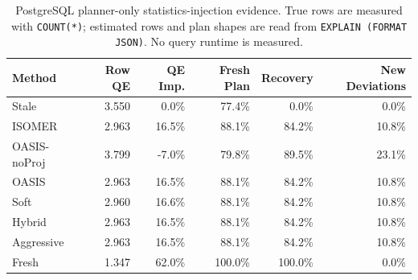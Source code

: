 \begin{table}[t]
  \centering
  \small
  \caption{PostgreSQL planner-only statistics-injection evidence. True rows are measured with \texttt{COUNT(*)}; estimated rows and plan shapes are read from \texttt{EXPLAIN (FORMAT JSON)}. No query runtime is measured.}
  \label{tab:postgres_planner_stats_injection}
  \setlength{\tabcolsep}{4pt}
  \begin{tabular}{lrrrrr}
    \toprule
    Method & Row QE & QE Imp. & Fresh Plan & Recovery & New Deviations \\
    \midrule
    Stale & 3.550 & 0.0\% & 77.4\% & 0.0\% & 0.0\% \\
    ISOMER & 2.963 & 16.5\% & 88.1\% & 84.2\% & 10.8\% \\
    OASIS-noProj & 3.799 & -7.0\% & 79.8\% & 89.5\% & 23.1\% \\
    OASIS & 2.963 & 16.5\% & 88.1\% & 84.2\% & 10.8\% \\
    Soft & 2.960 & 16.6\% & 88.1\% & 84.2\% & 10.8\% \\
    Hybrid & 2.963 & 16.5\% & 88.1\% & 84.2\% & 10.8\% \\
    Aggressive & 2.963 & 16.5\% & 88.1\% & 84.2\% & 10.8\% \\
    Fresh & 1.347 & 62.0\% & 100.0\% & 100.0\% & 0.0\% \\
    \bottomrule
  \end{tabular}
\end{table}
